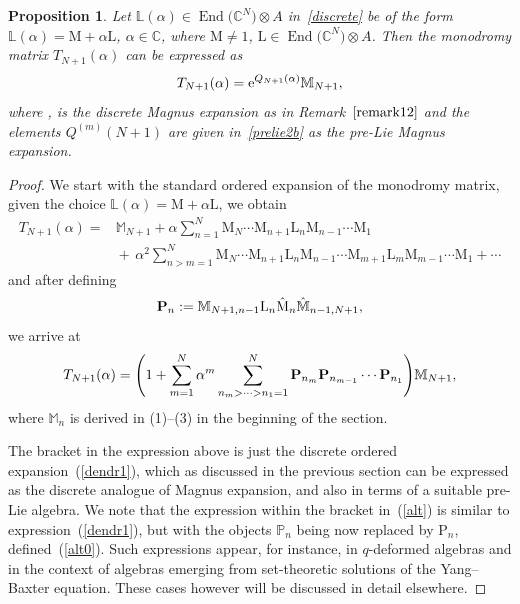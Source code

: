 \documentclass[10pt,a4paper]{amsart}
\numberwithin{equation}{section}
\newtheorem{pro}[thm]{Proposition}
\theoremstyle{definition}
\DeclareMathOperator{\EEnd}{End}%
\def\mathfrak#1{#1}%
\def\mathcal#1{#1}%
\begin{document}
\begin{pro}
Let ${\mathbb L}(\alpha)\in \EEnd\bigl({\mathbb C}^{\mathcal N}\bigr) \otimes {\mathfrak A}$ in~\eqref{discrete} be of the form ${\mathbb L}(\alpha) = {\mathrm M} + \alpha {\mathrm L}$, $\alpha \in {\mathbb C}$, where ${\mathrm M}\neq 1$, ${\mathrm L}\in \EEnd\bigl({\mathbb C}^{\mathcal N}\bigr) \otimes {\mathfrak A}$. Then the monodromy matrix $T_{N+1}(\alpha)$ can be expressed as
\begin{equation*}
T_{N+1}(\alpha) ={\rm e}^{{\mathcal Q}_{N+1}(\alpha)}{\mathbb M}_{N+1},
\end{equation*}
where , \smash{${\mathcal Q}_{N+1}(\alpha) = \sum_{m=1}^{N+1} \alpha^m {\mathcal Q}^{(m)}(N+1)$} is the discrete Magnus expansion as in Remark~$\ref{remark12}$ and the elements ${\mathcal Q}^{(m)}(N+1)$ are given in~\eqref{prelie2b} as the pre-Lie Magnus expansion.
\end{pro}
\begin{proof}

We start with the standard ordered expansion of the monodromy matrix, given the choice ${\mathbb L}(\alpha)= {\mathrm M} + \alpha {\mathrm L}$, we obtain
\begin{align*}
T_{N+1}(\alpha)={}& {\mathbb M}_{N+1} + \alpha\sum_{n=1}^N {\mathrm M}_{N} \cdots {\mathrm M}_{n+1} {\mathrm L}_n {\mathrm M}_{n-1} \cdots {\mathrm M}_1 \nonumber\\
&{}{+}\, \alpha^2 \sum_{n>m=1}^N {\mathrm M}_N \cdots {\mathrm M}_{n+1}{\mathrm L}_n {\mathrm M}_{n-1} \cdots {\mathrm M}_{m+1} {\mathrm L}_m {\mathrm M}_{m-1} \cdots {\mathrm M}_1 + \cdots
\end{align*}
and after defining
\begin{equation}
{\bf P}_n := {\mathbb M}_{N+1,n-1}{\mathrm L}_n \hat {\mathrm M}_n \hat {\mathbb M}_{n-1, N+1}, \label{alt0}
\end{equation}
we arrive at
\begin{gather}
T_{N+1}(\alpha) = \Biggl(1+ \sum_{m=1}^N\alpha^m \sum_{n_m>\dots >n_1=1}^N{\bf P}_{n_m} {\bf P}_{n_{m-1}} \cdots {\bf P}_{n_1} \Biggr){\mathbb M}_{N+1}, \label{alt}
\end{gather}
where ${\mathbb M}_n$ is derived in (1)--(3) in the beginning of the section.

The bracket in the expression above is just the discrete ordered expansion~(\ref{dendr1}), which as discussed in the previous section can be expressed as the discrete analogue of Magnus expansion, and also in terms of a suitable pre-Lie algebra.
{We note that the expression within the bracket in~(\ref{alt}) is similar to expression~(\ref{dendr1}), but with the objects
${\mathbb P}_n$ being now replaced by ${\mathrm P}_n$, defined~(\ref{alt0}).} Such expressions appear, for instance, in $q$-deformed algebras and in the context of algebras emerging from set-theoretic solutions of the Yang--Baxter equation. These cases however will be discussed in detail elsewhere.
\end{proof}
\end{document}

